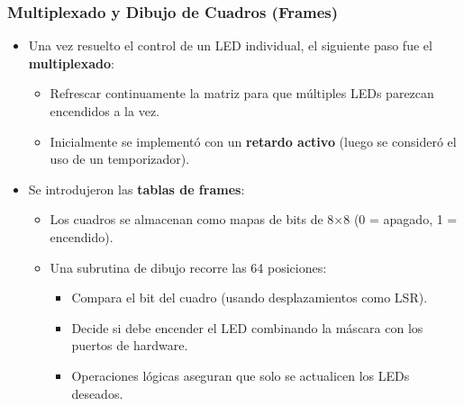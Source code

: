 \subsubsection{Multiplexado y Dibujo de Cuadros (Frames)}
\begin{itemize}[leftmargin=2em]
    \item Una vez resuelto el control de un LED individual, el siguiente paso fue el \textbf{multiplexado}:
    \begin{itemize}
        \item Refrescar continuamente la matriz para que múltiples LEDs parezcan encendidos a la vez.
        \item Inicialmente se implementó con un \textbf{retardo activo} (luego se consideró el uso de un temporizador).
    \end{itemize}
    \item Se introdujeron las \textbf{tablas de frames}:
    \begin{itemize}
        \item Los cuadros se almacenan como mapas de bits de 8×8 (0 = apagado, 1 = encendido).
        \item Una subrutina de dibujo recorre las 64 posiciones:
        \begin{itemize}
            \item Compara el bit del cuadro (usando desplazamientos como LSR).
            \item Decide si debe encender el LED combinando la máscara con los puertos de hardware.
            \item Operaciones lógicas aseguran que solo se actualicen los LEDs deseados.
        \end{itemize}
    \end{itemize}
\end{itemize}

